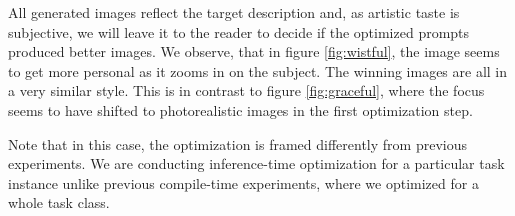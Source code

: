 All generated images reflect the target description and, as artistic taste is subjective, we will leave it to the reader 
to decide if the optimized prompts produced better images. We observe, that in figure \ref{fig:wistful}, the image seems to get more personal as it zooms in on the subject.
The winning images are all in a very similar style. This is in contrast to figure \ref{fig:graceful}, where the focus seems to have shifted to 
photorealistic images in the first optimization step.

Note that in this case, the optimization is framed differently from previous experiments.
We are conducting inference-time optimization for a particular task instance unlike previous compile-time experiments, where we optimized for a whole task class.
